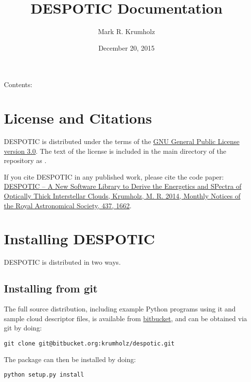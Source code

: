 \documentclass[letterpaper,10pt,english]{sphinxmanual}
\title{DESPOTIC Documentation}
\date{December 20, 2015}
\author{Mark R. Krumholz}
\begin{document}
\maketitle
\tableofcontents
{}\label{index::doc}


Contents:


\chapter{License and Citations}
\label{license:welcome-to-despotic-s-documentation}\label{license:license-and-citations}\label{license::doc}
DESPOTIC is distributed under the terms of the \href{http://www.gnu.org/copyleft/gpl.html}{GNU General Public License version 3.0}. The text of the license is included in the main directory of the repository as .

If you cite DESPOTIC in any published work, please cite the code paper: \href{http://adsabs.harvard.edu/abs/2014MNRAS.437.1662K}{DESPOTIC -- A New Software Library to Derive the Energetics and SPectra of Optically Thick Interstellar Clouds, Krumholz, M. R. 2014, Monthly Notices of the Royal Astronomical Society, 437, 1662}.


\chapter{Installing DESPOTIC}
\label{installation::doc}\label{installation:installing-despotic}
DESPOTIC is distributed in two ways.


\section{Installing from git}
\label{installation:installing-from-git}
The full source distribution, including example Python programs using it and sample cloud descriptor files, is available from \href{https://bitbucket.org/krumholz/despotic/}{bitbucket}, and can be obtained via git by doing:

\begin{Verbatim}[commandchars=\\\{\}]
git clone git@bitbucket.org:krumholz/despotic.git
\end{Verbatim}

The package can then be installed by doing:

\begin{Verbatim}[commandchars=\\\{\}]
python setup.py install
\end{Verbatim}
\end{document}
